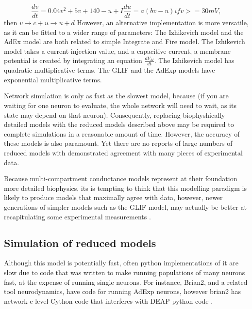 \begin{displaymath}
\frac{dv}{dt}=0.04v^{2}+5v+140-u+I
\frac{du}{dt} = a(bv-u)
if v>=30mV,
\end{displaymath}
 then $ v \rightarrow c + u 	\rightarrow u+ d$
However, an alternative implementation is more versatile, as it can be fitted to a wider range of parameters:
The Izhikevich model and the AdEx model are both related to simple Integrate and Fire model.
The Izhikevich model takes a current injection value, and a capacitive current, a membrane potential is created by integrating an equation $\frac{dV_{M}}{dt}$.
The Izhikevich model has quadratic multiplicative terms.
The GLIF and the AdExp models have exponential multiplicative terms.

Network simulation is only as fast as the slowest model, because (if you are waiting for one neuron to evaluate, the whole network will need to wait, as its state may depend on that neuron).
Consequently, replacing biophyshically detailed models with the reduced models described above may be required to complete simulations in a reasonable amount of time.
However, the accuracy of these models is also paramount.
Yet there are no reports of large numbers of reduced models with demonstrated agreement with many pieces of experimental data.

Because multi-compartment conductance models represent at their foundation more detailed biophysics, its is tempting to think that this modelling paradigm is likely to produce models that maximally agree with data, however, newer generations of simpler models such as the GLIF model, may actually be better at recapitulating some experimental measurements \cite{meunier2002playing}.


\subsection{Simulation of reduced models}
Although this model is potentially fast, often python implementations of it are slow due to code that was written to make running populations of many neurons fast, at the expense of running single neurons. 
For instance, Brian2, and a related tool neurodynamics, have code for running AdExp neurons, however brian2 has network c-level Cython code that interferes with DEAP python code \cite{DEAP_JMLR2012}.
\\
